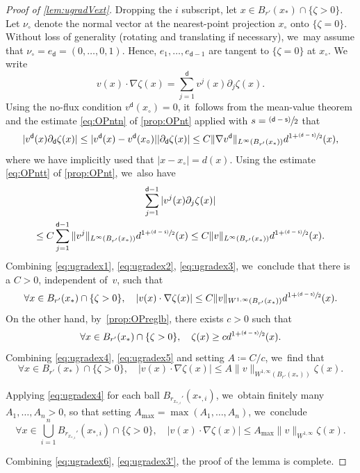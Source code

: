 \documentclass[JEP,XML,SOM,Unicode,published]{cedram}
\newcommand{\psfrac}[2]{\sfrac{(#1)}{#2}}
\theoremstyle{plain}
\theoremstyle{definition}
\let\nab\nabla
\let\p\partial
\renewcommand{\d}{\mathsf{d}}
\newcommand{\s}{\mathsf{s}}
\begin{document}
\begin{proof}[Proof of \cref{lem:ugradVext}]
Dropping the $i$ subscript, let $x\in B_{r'}(x_*) \cap \{\zeta>0\}$. Let $\nu_\circ$ denote the normal vector at the nearest-point projection $x_\circ$ onto $\{\zeta=0\}$. Without loss of generality (rotating and translating if necessary), we~may assume that $\nu_\circ = e_{\d} = (0,\ldots,0,1)$. Hence, $e_{1},\ldots,e_{\d-1}$ are tangent to $\{\zeta=0\}$ at $x_\circ$. We write
\begin{equation}\label{eq:ugradex1}
v(x)\cdot\nab\zeta(x) = \sum_{j=1}^\d v^j(x)\p_j\zeta(x).
\end{equation}
Using the no-flux condition $v^\d(x_\circ) = 0$, it~follows from the mean-value theorem and the estimate \eqref{eq:OPntn} of \cref{prop:OPnt} {applied with $s= \psfrac{\d-\s}{2}$} that
\begin{equation}\label{eq:ugradex2}
|v^\d(x)\p_\d\zeta(x)| \le |v^\d(x)-v^\d(x_\circ)| |\p_\d\zeta(x)| \le C\|\nab v^\d\|_{L^\infty(B_{r'}(x_*))}d^{1+\psfrac{\d-\s}{2}}(x),
\end{equation}
where we have implicitly used that $|x-x_\circ| = d(x)$. Using the estimate \eqref{eq:OPntt} of \cref{prop:OPnt}, we~also have
\begin{multline}\label{eq:ugradex3}
\sum_{j=1}^{\d-1} |v^j(x)\p_j\zeta(x)|\\
\le C\sum_{j=1}^{\d-1} \|v^j\|_{L^\infty(B_{r'}(x_*))} d^{1+\psfrac{\d-\s}{2}}(x) \le C\|v\|_{L^\infty(B_{r'}(x_*))} d^{1+\psfrac{\d-\s}{2}}(x).
\end{multline}
Combining \eqref{eq:ugradex1}, \eqref{eq:ugradex2}, \eqref{eq:ugradex3}, we~conclude that there is a $C>0$, independent of~$v$, such that
\begin{equation}\label{eq:ugradex4}
\forall x\in B_{r'}(x_*) \cap \{\zeta >0\}, \quad |v(x)\cdot\nab\zeta(x)| \le C\|v\|_{W^{1,\infty}(B_{r'}(x_*))} d^{1+\psfrac{\d-\s}{2}}(x).
\end{equation}
On the other hand, by~\cref{prop:OPreglb}, there exists $c>0$ such that
\begin{equation}\label{eq:ugradex5}
\forall x\in B_{r'}(x_*) \cap \{\zeta >0\}, \quad \zeta(x) \ge c d^{1+\psfrac{\d-\s}{2}}(x).
\end{equation}
Combining \eqref{eq:ugradex4}, \eqref{eq:ugradex5} {and setting $A\coloneqq C/c$}, we~find that
\begin{equation*}
\forall x\in B_{r'}(x_*) \cap \{\zeta >0\}, \quad |v(x)\cdot\nab\zeta(x)| \le A\|v\|_{W^{1,\infty}(B_{r'}(x_*))}\zeta(x).
\end{equation*}

Applying \eqref{eq:ugradex4} for each ball $B_{r_{x_{*,i}}'}(x_{*,i})$, we~obtain finitely many $A_1,\ldots,A_n>0$, so that setting $A_{\max} = \max(A_1,\ldots,A_n)$, we~conclude
\begin{equation}\label{eq:ugradex6}
\forall x\in \bigcup_{i=1}^n B_{r_{x_{*,i}}'}(x_{*,i}) \cap \{\zeta>0\}, \quad |v(x)\cdot\nab\zeta(x)| \le A_{\max}\|v\|_{W^{1,\infty}} \zeta(x).
\end{equation}

Combining \eqref{eq:ugradex6}, \eqref{eq:ugradex3'}, the proof of the lemma is complete.
\end{proof}



\end{document}
